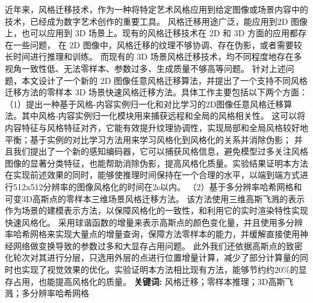 \cleardoublepage
{}

\setlength{\parindent}{2em} 
近年来，风格迁移技术，作为一种将特定艺术风格应用到给定图像或场景内容中的技术，已经成为数字艺术创作的重要工具。
风格迁移用途广泛，能应用到2D 图像上，也可以应用到 3D 场景上。现有的风格迁移技术在 2D 和 3D 方面的应用都存在一些问题，
在 2D 图像中，风格迁移的纹理不够协调、存在伪影，或者需要较长时间进行推理和训练。
而现有的 3D 场景风格迁移技术，均不同程度地存在多视角一致性低、无法零样本、参数过多、生成质量不够高等问题。
针对上述问题，本文设计了一个新的 2D 图像任意风格迁移算法，并提出了一个支持不同风格迁移方法的零样本 3D 场景快速风格迁移方法。具体工作主要包括以下两个方面：
\newline \indent（1）提出一种基于风格-内容实例归一化和对比学习的2D图像任意风格迁移算法。其中风格-内容实例归一化模块用来捕获远程和全局的风格相关性。
这可以将内容特征与风格特征对齐，它能有效提升纹理协调性，实现局部和全局风格较好地平衡；基于实例的对比学习方法用来学习风格化到风格化的关系并消除伪影；
并且我们提出了一个新的感知编码器，它可以捕获风格信息，避免模型过多关注风格图像的显著分类特征，也能帮助消除伪影，提高风格化质量。实验结果证明本方法在实现前述效果的同时，能够使推理时间保持在一个合理的水平，以端到端方式进行512x512分辨率的图像风格化的时间在2s以内。
\newline \indent（2）基于多分辨率哈希网格和可变3D高斯点的零样本三维场景风格迁移方法。
该方法使用三维高斯飞溅的表示作为场景的建模表示方法，以保障风格化的一致性，和利用它的实时渲染特性实现快速风格化。
采用球谐函数的增量来表示高斯点的颜色变化量，并且使用多分辨率哈希网格来实现大量点的增量查询，保障方法零样本的能力，并缓解直接使用神经网络做变换导致的参数过多和大显存占用问题。
此外我们还依据高斯点的致密化轮次对其进行分层，只选用外层的点进行位置增量计算，减少了部分计算量的同时也实现了视觉效果的优化。实验证明本方法相比现有方法，能够节约约$20\%$的显存占用，也能提高风格化的质量。
\newline
{\textbf{关键词:}}
风格迁移；零样本推理；3D高斯飞溅；多分辨率哈希网格

